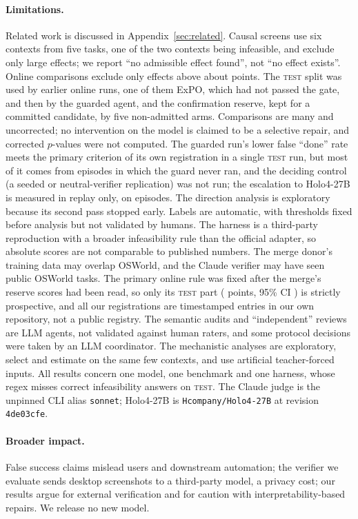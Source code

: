 \paragraph{Limitations.} Related work is discussed in Appendix~\ref{sec:related}. Causal screens use six contexts from five tasks, one of the two \fsp{} contexts being infeasible, and exclude only large effects; we report ``no admissible effect found'', not ``no effect exists''. Online comparisons exclude only effects above about \onMde{} points. The \textsc{test} split was used by \onNTestRuns{} earlier online runs, one of them ExPO, which had not passed the gate, and then by the guarded agent, and the confirmation reserve, kept for a committed candidate, by five non-admitted arms. Comparisons are many and uncorrected; no intervention on the model is claimed to be a selective repair, and corrected $p$-values were not computed. The guarded run's lower false ``done'' rate meets the primary criterion of its own registration in a single \textsc{test} run, but most of it comes from episodes in which the guard never ran, and the deciding control (a seeded or neutral-verifier replication) was not run; the escalation to Holo4-27B is measured in replay only, on \rbPrimEpisodes{} episodes. The direction analysis is exploratory because its second pass stopped early. Labels are automatic, with thresholds fixed before analysis but not validated by humans. The harness is a third-party reproduction with a broader infeasibility rule than the official adapter, so absolute scores are not comparable to published numbers. The merge donor's training data may overlap OSWorld, and the Claude verifier may have seen public OSWorld tasks. The primary online rule was fixed after the merge's reserve scores had been read, so only its \textsc{test} part (\onTestCuaDelta{} points, 95\% CI \onTestCuaCi) is strictly prospective, and all our registrations are timestamped entries in our own repository, not a public registry. The semantic audits and ``independent'' reviews are LLM agents, not validated against human raters, and some protocol decisions were taken by an LLM coordinator. The mechanistic analyses are exploratory, select and estimate on the same few contexts, and use artificial teacher-forced inputs. All results concern one model, one benchmark and one harness, whose regex misses \cdRegex{} correct infeasibility answers on \textsc{test}. The Claude judge is the unpinned CLI alias \texttt{sonnet}; Holo4-27B is \texttt{Hcompany/Holo4-27B} at revision \texttt{4de03cfe}.

\paragraph{Broader impact.} False success claims mislead users and downstream automation; the verifier we evaluate sends desktop screenshots to a third-party model, a privacy cost; our results argue for external verification and for caution with interpretability-based repairs. We release no new model.
